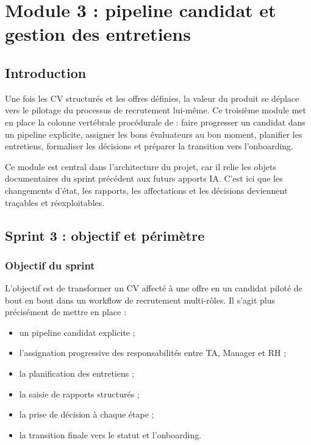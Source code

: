 \chapter{Module 3 : pipeline candidat et gestion des entretiens}

\section*{Introduction}
Une fois les CV structurés et les offres définies, la valeur du produit se déplace vers le pilotage du processus de recrutement lui-même. Ce troisième module met en place la colonne vertébrale procédurale de \projectname{} : faire progresser un candidat dans un pipeline explicite, assigner les bons évaluateurs au bon moment, planifier les entretiens, formaliser les décisions et préparer la transition vers l'onboarding.

Ce module est central dans l'architecture du projet, car il relie les objets documentaires du sprint précédent aux futurs apports IA. C'est ici que les changements d'état, les rapports, les affectations et les décisions deviennent traçables et réexploitables.

\section{Sprint 3 : objectif et périmètre}

\subsection{Objectif du sprint}
L'objectif est de transformer un CV affecté à une offre en un candidat piloté de bout en bout dans un workflow de recrutement multi-rôles. Il s'agit plus précisément de mettre en place :
\begin{itemize}
  \item un pipeline candidat explicite ;
  \item l'assignation progressive des responsabilités entre TA, Manager et RH ;
  \item la planification des entretiens ;
  \item la saisie de rapports structurés ;
  \item la prise de décision à chaque étape ;
  \item la transition finale vers le statut  et l'onboarding.
\end{itemize}

